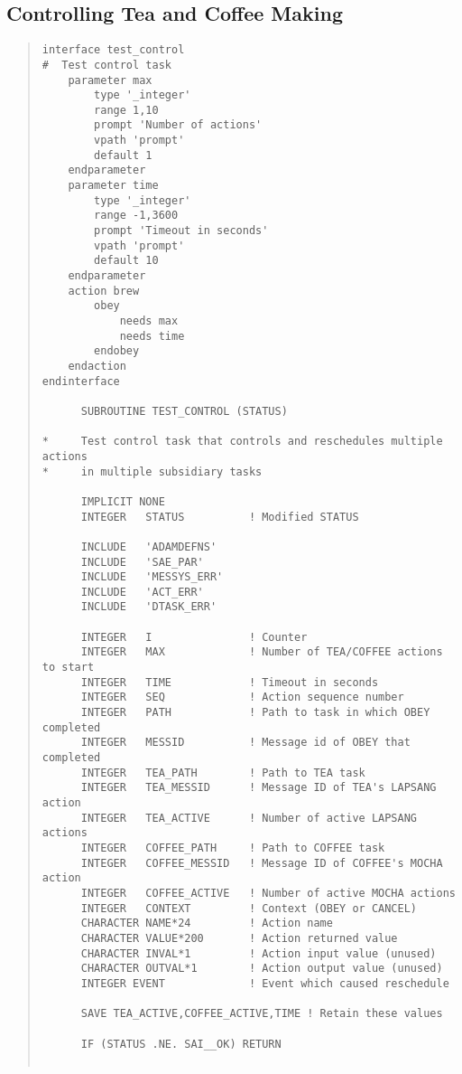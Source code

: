 \subsection{Controlling Tea and Coffee Making}
\small \begin{quote} \begin{verbatim}
interface test_control
#  Test control task
    parameter max
        type '_integer'
        range 1,10
        prompt 'Number of actions'
        vpath 'prompt'
        default 1
    endparameter
    parameter time
        type '_integer'
        range -1,3600
        prompt 'Timeout in seconds'
        vpath 'prompt'
        default 10
    endparameter
    action brew
        obey
            needs max
            needs time
        endobey
    endaction
endinterface

      SUBROUTINE TEST_CONTROL (STATUS)

*     Test control task that controls and reschedules multiple actions
*     in multiple subsidiary tasks

      IMPLICIT NONE
      INTEGER   STATUS          ! Modified STATUS
 
      INCLUDE   'ADAMDEFNS'
      INCLUDE   'SAE_PAR'
      INCLUDE   'MESSYS_ERR'
      INCLUDE   'ACT_ERR'
      INCLUDE   'DTASK_ERR'
 
      INTEGER   I               ! Counter
      INTEGER   MAX             ! Number of TEA/COFFEE actions to start
      INTEGER   TIME            ! Timeout in seconds
      INTEGER   SEQ             ! Action sequence number
      INTEGER   PATH            ! Path to task in which OBEY completed
      INTEGER   MESSID          ! Message id of OBEY that completed
      INTEGER   TEA_PATH        ! Path to TEA task
      INTEGER   TEA_MESSID      ! Message ID of TEA's LAPSANG action
      INTEGER   TEA_ACTIVE      ! Number of active LAPSANG actions
      INTEGER   COFFEE_PATH     ! Path to COFFEE task
      INTEGER   COFFEE_MESSID   ! Message ID of COFFEE's MOCHA action
      INTEGER   COFFEE_ACTIVE   ! Number of active MOCHA actions
      INTEGER   CONTEXT         ! Context (OBEY or CANCEL)
      CHARACTER NAME*24         ! Action name
      CHARACTER VALUE*200       ! Action returned value
      CHARACTER INVAL*1         ! Action input value (unused)
      CHARACTER OUTVAL*1        ! Action output value (unused)
      INTEGER EVENT             ! Event which caused reschedule

      SAVE TEA_ACTIVE,COFFEE_ACTIVE,TIME ! Retain these values
 
      IF (STATUS .NE. SAI__OK) RETURN


\end{verbatim}
\end{quote}
